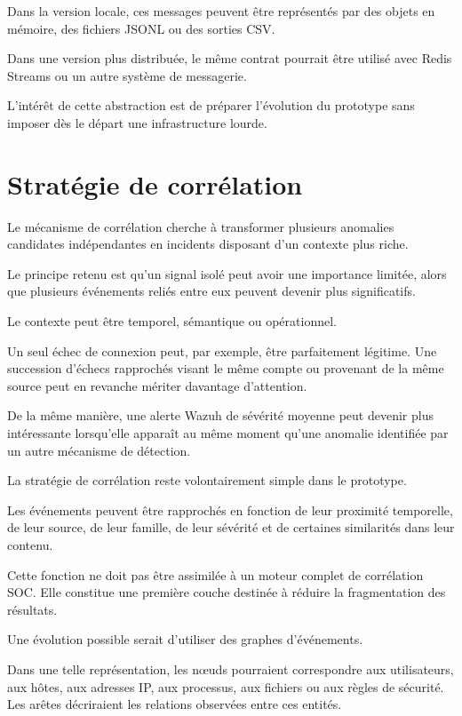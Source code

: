 Dans la version locale, ces messages peuvent être représentés par des objets en mémoire, des fichiers JSONL ou des sorties CSV.

Dans une version plus distribuée, le même contrat pourrait être utilisé avec Redis Streams ou un autre système de messagerie.

L'intérêt de cette abstraction est de préparer l'évolution du prototype sans imposer dès le départ une infrastructure lourde.

\section{Stratégie de corrélation}

Le mécanisme de corrélation cherche à transformer plusieurs anomalies candidates indépendantes en incidents disposant d'un contexte plus riche.

Le principe retenu est qu'un signal isolé peut avoir une importance limitée, alors que plusieurs événements reliés entre eux peuvent devenir plus significatifs.

Le contexte peut être temporel, sémantique ou opérationnel.

Un seul échec de connexion peut, par exemple, être parfaitement légitime. Une succession d'échecs rapprochés visant le même compte ou provenant de la même source peut en revanche mériter davantage d'attention.

De la même manière, une alerte Wazuh de sévérité moyenne peut devenir plus intéressante lorsqu'elle apparaît au même moment qu'une anomalie identifiée par un autre mécanisme de détection.

La stratégie de corrélation reste volontairement simple dans le prototype.

Les événements peuvent être rapprochés en fonction de leur proximité temporelle, de leur source, de leur famille, de leur sévérité et de certaines similarités dans leur contenu.

Cette fonction ne doit pas être assimilée à un moteur complet de corrélation SOC. Elle constitue une première couche destinée à réduire la fragmentation des résultats.

Une évolution possible serait d'utiliser des graphes d'événements.

Dans une telle représentation, les nœuds pourraient correspondre aux utilisateurs, aux hôtes, aux adresses IP, aux processus, aux fichiers ou aux règles de sécurité. Les arêtes décriraient les relations observées entre ces entités.

